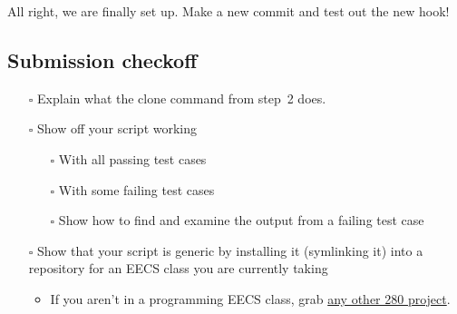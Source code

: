 \documentclass{article}
\begin{document}
\medskip

\noindent
All right, we are finally set up. Make a new commit and test out the new hook!

\subsection*{Submission checkoff}
\begin{itemize}
  \item[$\square$] Explain what the clone command from step~2 does.
  \item[$\square$] Show off your script working
    \begin{itemize}
      \item[$\square$] With all passing test cases
      \item[$\square$] With some failing test cases
      \item[$\square$] Show how to find and examine the output from a failing
        test case
    \end{itemize}
  \item[$\square$] Show that your script is generic by installing it (symlinking
    it) into a repository for an EECS class you are currently taking
    \begin{itemize}
      \item If you aren't in a programming EECS class, grab
        \href{http://www.andrewdeorio.com/teaching/eecs280/}{any other 280
        project}.
    \end{itemize}
\end{itemize}
\end{document}

